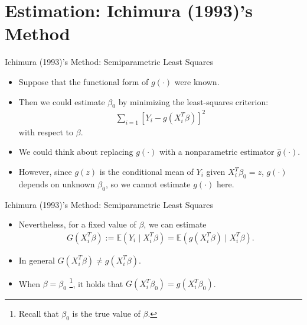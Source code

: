 \documentclass[xcolor=svgnames,dvipdfmx,cjk]{beamer}
\theoremstyle{example}
\begin{document}
\section{Estimation: Ichimura (1993)'s Method}
\begin{frame}
  \tableofcontents[currentsection]
\end{frame}

\begin{frame}{Ichimura (1993)'s Method: Semiparametric Least Squares}
\begin{itemize}
  \item Suppose that the functional form of $g(\cdot)$ were known.
  \item Then we could estimate $\beta_0$ by minimizing the least-squares criterion:
        \begin{align*}
        \sum_{i=1} \left[ Y_i - g(X_i^{T}\beta) \right]^2
        \end{align*}
        with respect to $\beta$.
  \item We could think about replacing $g(\cdot)$ with a nonparametric estimator $\hat{g}(\cdot)$.
  \item However, since $g(z)$ is the conditional mean of $Y_i$ given $X_i^{T} \beta_0 = z$,
        $g(\cdot)$ depends on unknown $\beta_0$, so we cannot estimate $g(\cdot)$ here.
\end{itemize}
\end{frame}

\begin{frame}{Ichimura (1993)'s Method: Semiparametric Least Squares}
\begin{itemize}
  \item Nevertheless, for a fixed value of $\beta$, we can estimate
        \begin{align*}
        G(X_i^{T} \beta) 
          := \mathbb{E} (Y_i \mid X_i^{T}\beta) 
           = \mathbb{E} (g(X_i^{T}\beta) \mid X_i^{T}\beta).
        \end{align*}
  \item In general $G(X_i^{T}\beta) \neq g(X_i^{T} \beta)$.
  \item When $\beta = \beta_0$ \footnote{Recall that $\beta_0$ is the true value of $\beta$.},
        it holds that $G(X_i^{T}\beta_0) = g(X_i^{T} \beta_0)$. 
\end{itemize}  
\end{frame}
\end{document}
